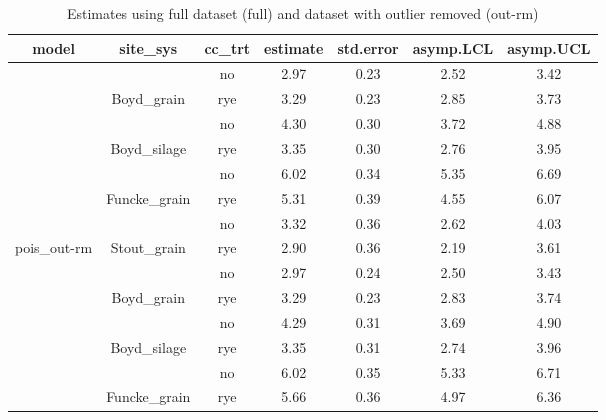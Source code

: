 \documentclass[
]{article}
\begin{document}
\begin{table}[H]

\caption{\label{tab:estimates}Estimates using full dataset (full) and dataset with outlier removed (out-rm)}
\centering
\begin{tabular}[t]{ccccccc}
\toprule
model & site\_sys & cc\_trt & estimate & std.error & asymp.LCL & asymp.UCL\\
\midrule
\rowcolor{gray!6}   &  & no & 2.97 & 0.23 & 2.52 & 3.42\\

 & \multirow{-2}{*}{\centering\arraybackslash Boyd\_grain} & rye & 3.29 & 0.23 & 2.85 & 3.73\\

\rowcolor{gray!6}   &  & no & 4.30 & 0.30 & 3.72 & 4.88\\

 & \multirow{-2}{*}{\centering\arraybackslash Boyd\_silage} & rye & 3.35 & 0.30 & 2.76 & 3.95\\

\rowcolor{gray!6}   &  & no & 6.02 & 0.34 & 5.35 & 6.69\\

 & \multirow{-2}{*}{\centering\arraybackslash Funcke\_grain} & rye & 5.31 & 0.39 & 4.55 & 6.07\\

\rowcolor{gray!6}   &  & no & 3.32 & 0.36 & 2.62 & 4.03\\

\multirow{-8}{*}{\centering\arraybackslash pois\_out-rm} & \multirow{-2}{*}{\centering\arraybackslash Stout\_grain} & rye & 2.90 & 0.36 & 2.19 & 3.61\\
\cmidrule{1-7}
\rowcolor{gray!6}   &  & no & 2.97 & 0.24 & 2.50 & 3.43\\

 & \multirow{-2}{*}{\centering\arraybackslash Boyd\_grain} & rye & 3.29 & 0.23 & 2.83 & 3.74\\

\rowcolor{gray!6}   &  & no & 4.29 & 0.31 & 3.69 & 4.90\\

 & \multirow{-2}{*}{\centering\arraybackslash Boyd\_silage} & rye & 3.35 & 0.31 & 2.74 & 3.96\\

\rowcolor{gray!6}   &  & no & 6.02 & 0.35 & 5.33 & 6.71\\

 & \multirow{-2}{*}{\centering\arraybackslash Funcke\_grain} & rye & 5.66 & 0.36 & 4.97 & 6.36\\


\end{tabular}
\end{table}
\end{document}
